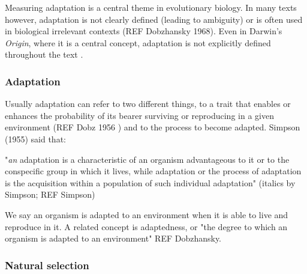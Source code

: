 Measuring adaptation is a central theme in evolutionary biology. In many texts however, adaptation is not clearly defined (leading to ambiguity) or is often used in biological irrelevant contexts (REF Dobzhansky 1968). 
Even in Darwin's \textit{Origin}, where it is a central concept, adaptation is not explicitly defined throughout the text \citep{darwin1859origin}.

\subsubsection{Adaptation}

Usually adaptation can refer to two different things, to a trait that enables or enhances the probability of its bearer surviving or reproducing in a given environment (REF Dobz 1956 ) and to the process to become adapted.
Simpson (1955) said that: 

"\textit{an} adaptation is a characteristic of an organism advantageous to it or to the conspecific group in which it lives, while adaptation or the process of adaptation is the acquisition within a population of such individual adaptation" (italics by Simpson; REF Simpson)

We say an organism is adapted to an environment when it is able to live and reproduce in it. A related concept is adaptedness, or "the degree to which an organism is adapted to an environment" REF Dobzhansky.
%
%


\subsubsection{Natural selection}

